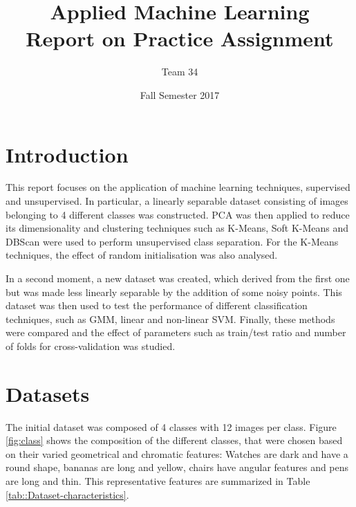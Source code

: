 \documentclass[a4paper,10pt]{article}
\title{Applied Machine Learning\\Report on Practice Assignment}
\author{Team 34}
\date{Fall Semester 2017}
\begin{document}
\maketitle

\tableofcontents
\newpage

\section{Introduction}

This report focuses on the application of machine learning techniques, supervised and unsupervised. In particular, a linearly separable dataset consisting of images belonging to 4 different classes was constructed. PCA was then applied to reduce its dimensionality and clustering techniques such as K-Means, Soft K-Means and DBScan were used to perform unsupervised class separation. For the K-Means techniques, the effect of random initialisation was also analysed. 

In a second moment, a new dataset was created, which derived from the first one but was made less linearly separable by the addition of some noisy points. This dataset was then used to test the performance of different classification techniques, such as GMM, linear and non-linear SVM. Finally, these methods were compared and the effect of parameters such as train/test ratio and number of folds for cross-validation was studied. 


\section{Datasets}

The initial dataset was composed of 4 classes with 12 images per class. Figure \ref{fig:class} shows the composition of the different classes, that were chosen based on their varied geometrical and chromatic features: Watches are dark and have a round shape, bananas are long and yellow, chairs have angular features and pens are long and thin. This representative features are summarized in Table \ref{tab::Dataset-characteristics}. 
\end{document}
